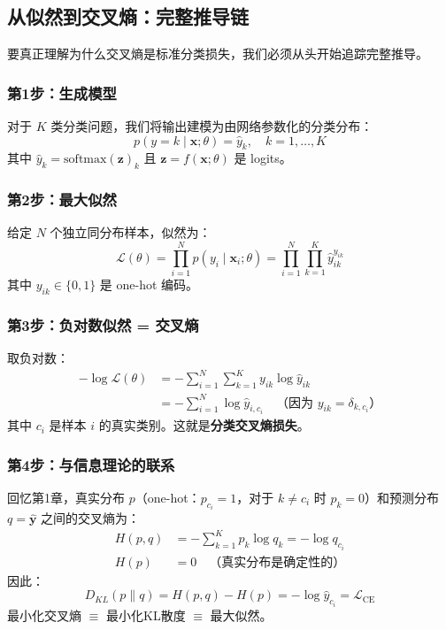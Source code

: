 \subsection{从似然到交叉熵：完整推导链}

要真正理解为什么交叉熵是标准分类损失，我们必须从头开始追踪完整推导。

\subsubsection{第1步：生成模型}

对于 $K$ 类分类问题，我们将输出建模为由网络参数化的分类分布：
\begin{equation}
p(y = k \mid \mathbf{x}; \theta) = \hat{y}_k, \quad k = 1, \ldots, K
\end{equation}
其中 $\hat{y}_k = \text{softmax}(\mathbf{z})_k$ 且 $\mathbf{z} = f(\mathbf{x}; \theta)$ 是 logits。

\subsubsection{第2步：最大似然}

给定 $N$ 个独立同分布样本，似然为：
\begin{equation}
\mathcal{L}(\theta) = \prod_{i=1}^{N} p(y_i \mid \mathbf{x}_i; \theta) = \prod_{i=1}^{N} \prod_{k=1}^{K} \hat{y}_{ik}^{y_{ik}}
\end{equation}
其中 $y_{ik} \in \{0, 1\}$ 是 one-hot 编码。

\subsubsection{第3步：负对数似然 = 交叉熵}

取负对数：
\begin{align}
-\log \mathcal{L}(\theta) &= -\sum_{i=1}^{N} \sum_{k=1}^{K} y_{ik} \log \hat{y}_{ik} \\
&= -\sum_{i=1}^{N} \log \hat{y}_{i, c_i} \quad \text{（因为 } y_{ik} = \delta_{k, c_i}\text{）}
\end{align}
其中 $c_i$ 是样本 $i$ 的真实类别。这就是\textbf{分类交叉熵损失}。

\subsubsection{第4步：与信息理论的联系}

回忆第1章，真实分布 $p$（one-hot：$p_{c_i} = 1$，对于 $k \neq c_i$ 时 $p_k = 0$）和预测分布 $q = \hat{\mathbf{y}}$ 之间的交叉熵为：
\begin{align}
H(p, q) &= -\sum_{k=1}^{K} p_k \log q_k = -\log q_{c_i} \\
H(p) &= 0 \quad \text{（真实分布是确定性的）}
\end{align}
因此：
\begin{equation}
D_{KL}(p \| q) = H(p, q) - H(p) = -\log \hat{y}_{c_i} = \mathcal{L}_{\text{CE}}
\end{equation}
最小化交叉熵 $\equiv$ 最小化KL散度 $\equiv$ 最大似然。

